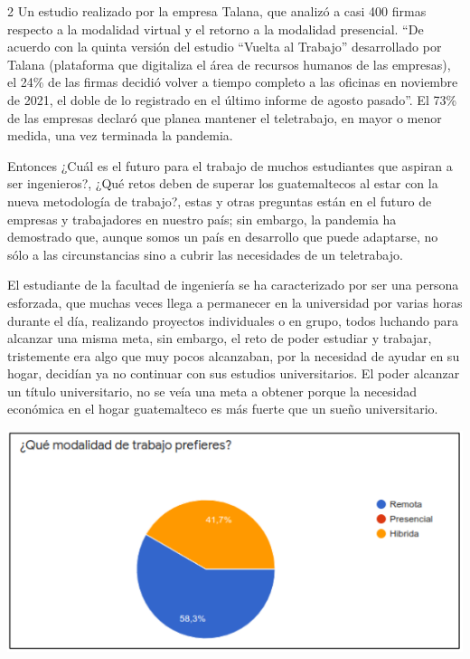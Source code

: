 \documentclass[12pt,spanish,Letterpaper,openany]{book}
\begin{document}
\begin {multicols}{2}
Un estudio realizado por la empresa Talana, que analizó a casi 400 firmas respecto a la modalidad virtual y el retorno a la modalidad presencial. ``De acuerdo con la quinta versión del estudio ``Vuelta al Trabajo'' desarrollado por Talana (plataforma que digitaliza el área de recursos humanos de las empresas), el 24\% de las firmas decidió volver a tiempo completo a las oficinas en noviembre de 2021, el doble de lo registrado en el último informe de agosto pasado''. El 73\% de las empresas declaró que planea mantener el teletrabajo, en mayor o menor medida, una vez terminada la pandemia.

Entonces ¿Cuál es el futuro para el trabajo de muchos estudiantes que aspiran a ser ingenieros?, ¿Qué retos deben de superar los guatemaltecos al estar con la nueva metodología de trabajo?, estas y otras preguntas están en el futuro de empresas y trabajadores en nuestro país; sin embargo, la pandemia ha demostrado que, aunque somos un país en desarrollo que puede adaptarse, no sólo a las circunstancias sino a cubrir las necesidades de un teletrabajo.

El estudiante de la facultad de ingeniería se ha caracterizado por ser una persona esforzada, que muchas veces llega a permanecer en la universidad por varias horas durante el día, realizando proyectos individuales o en grupo, todos luchando para alcanzar una misma meta, sin embargo, el reto de poder estudiar y trabajar, tristemente era algo que muy pocos alcanzaban, por la necesidad de ayudar en su hogar, decidían ya no continuar con sus estudios universitarios. El poder alcanzar un título universitario, no se veía una meta a obtener porque la necesidad económica en el hogar guatemalteco es más fuerte que un sueño universitario.

\begin {flushleft}
\noindent\begin{minipage}[c]{\columnwidth}
\centering

\includegraphics[width=1\linewidth]{images/pareja38_image2}


\end{minipage}
\end{flushleft}
\end{multicols}
\end{document}
